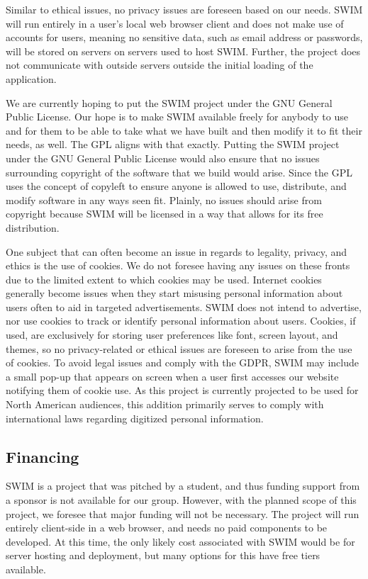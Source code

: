 \documentclass[
    paper=letter,
    parskip=half,
    fontsize=12pt,
    titlepage=firstiscover,
    toc=bibliography,
    numbers=endperiod
]{scrartcl}
\begin{document}
Similar to ethical issues, no privacy issues are foreseen based on our needs. SWIM will run entirely in a user's local web browser client and does not make use of accounts for users, meaning no sensitive data, such as email address or passwords, will be stored on servers on servers used to host SWIM. Further, the project does not communicate with outside servers outside the initial loading of the application.

We are currently hoping to put the SWIM project under the GNU General Public License. Our hope is to make SWIM available freely for anybody to use and for them to be able to take what we have built and then modify it to fit their needs, as well. The GPL aligns with that exactly.  Putting the SWIM project under the GNU General Public License would also ensure that no issues surrounding copyright of the software that we build would arise. Since the GPL uses the concept of copyleft to ensure anyone is allowed to use, distribute, and modify software in any ways seen fit. Plainly, no issues should arise from copyright because SWIM will be licensed in a way that allows for its free distribution.

One subject that can often become an issue in regards to legality, privacy, and ethics is the use of cookies. We do not foresee having any issues on these fronts due to the limited extent to which cookies may be used. Internet cookies generally become issues when they start misusing personal information about users often to aid in targeted advertisements. SWIM does not intend to advertise, nor use cookies to track or identify personal information about users. Cookies, if used, are exclusively for storing user preferences like font, screen layout, and themes, so no privacy-related or ethical issues are foreseen to arise from the use of cookies. To avoid legal issues and comply with the GDPR, SWIM may include a small pop-up that appears on screen when a user first accesses our website notifying them of cookie use. As this project is currently projected to be used for North American audiences, this addition primarily serves to comply with international laws regarding digitized personal information.


\subsection{Financing}
SWIM is a project that was pitched by a student, and thus funding support from a sponsor is not available for our group. However, with the planned scope of this project, we foresee that major funding will not be necessary. The project will run entirely client-side in a web browser, and needs no paid components to be developed. At this time, the only likely cost associated with SWIM would be for server hosting and deployment, but many options for this have free tiers available.
\end{document}
